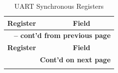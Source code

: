 \documentclass[main\_\_EN.tex]{subfiles}
\begin{document}
\begin{longtable}[c]{|m{6cm}|m{6cm}|}
\caption{UART Synchronous Registers}
\label{tab:uart-sync-reg} \\
    \hline
    \rowcolor{lightgray}
        \textbf{Register} & \textbf{Field} \\\hline
    \endfirsthead
        \multicolumn{2}{c}{\bfseries \tablename\ \thetable{} -- cont'd from previous page}\\\hline

    \rowcolor{lightgray}
        \textbf{Register} & \textbf{Field} \\\hline
    \endhead

        \multicolumn{2}{r}{\textbf{Cont'd on next page}} \\
    \endfoot
    \endlastfoot
    \hline


\end{longtable}
\end{document}
